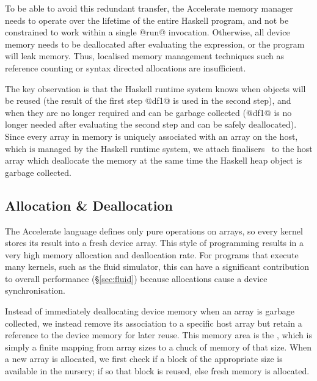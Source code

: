 To be able to avoid this redundant transfer, the Accelerate memory manager needs
to operate over the lifetime of the entire Haskell program, and not be
constrained to work within a single @run@ invocation. Otherwise, all device
memory needs to be deallocated after evaluating the expression, or the program
will leak memory. Thus, localised memory management techniques such as reference
counting or syntax directed allocations are insufficient.

The key observation is that the Haskell runtime system knows when objects will
be reused (the result of the first step @df1@ is used in the second step),
and when they are no longer required and can be garbage collected (@df1@ is
no longer needed after evaluating the second step and can be safely
deallocated). Since every array in \GPU memory is uniquely associated with an
array on the host, which is managed by the Haskell runtime system, we attach
finalisers~\cite{PeytonJones:2000ks} to the host array which deallocate the
\GPU memory at the same time the Haskell heap object is garbage collected.

% 


\subsection{Allocation \& Deallocation}

The Accelerate language defines only pure operations on arrays, so every kernel
stores its result into a fresh device array. This style of programming results
in a very high memory allocation and deallocation rate. For programs that
execute many kernels, such as the fluid simulator, this can have a
significant contribution to overall performance (\S\ref{sec:fluid}) because
allocations cause a device synchronisation.

Instead of immediately deallocating device memory when an array is garbage
collected, we instead remove its association to a specific host array but retain
a reference to the device memory for later reuse. This memory area is the
, which is simply a finite mapping from array sizes to a chuck
of memory of that size. When a new array is allocated, we first check if a block
of the appropriate size is available in the nursery; if so that block is reused,
else fresh memory is allocated.

